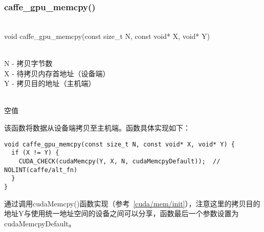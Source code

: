 \subsubsection{caffe\_gpu\_memcpy()}
\begin{cnfrmfunc}
   \item{}\\
     void caffe\_gpu\_memcpy(const size\_t N, const void* X, void* Y)
   \item{}\\
     N - 拷贝字节数\\
     X - 待拷贝内存首地址（设备端）\\
     Y - 拷贝目的地址（主机端）
   \item{}\\
     空值
\end{cnfrmfunc}
该函数将数据从设备端拷贝至主机端。函数具体实现如下：
\begin{verbatim}
void caffe_gpu_memcpy(const size_t N, const void* X, void* Y) {
  if (X != Y) {
    CUDA_CHECK(cudaMemcpy(Y, X, N, cudaMemcpyDefault));  // NOLINT(caffe/alt_fn)
  }
}
\end{verbatim}
通过调用cudaMemcpy()函数实现（参考~\ref{cuda/mem/init}），注意这里的拷贝目的地址Y与使用统一地址空间的设备之间可以分享，函数最后一个参数设置为cudaMemcpyDefault。
